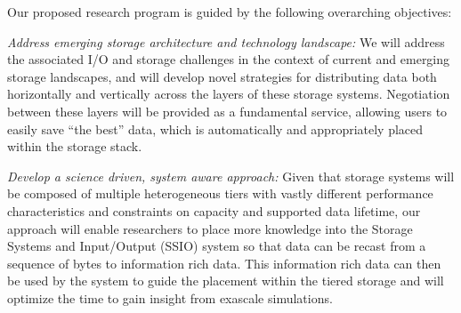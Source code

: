 % 
Our proposed research program is guided by the following overarching objectives:
\begin{tightItemize}
\item
{\em Address emerging storage architecture and technology landscape:}
We will address the associated I/O and storage challenges in the context of
current and emerging storage landscapes,
and will develop novel strategies for distributing 
data both horizontally and vertically across the layers of these storage systems.  
Negotiation between these layers will be provided as a fundamental service, allowing users to
easily save ``the best''  data, which is automatically and appropriately placed within the
 storage stack.
\item
{\em Develop a science driven, system aware approach:}
%
Given that storage systems will be composed of multiple heterogeneous tiers with
vastly different performance characteristics and constraints on capacity and 
supported data lifetime, our approach will enable researchers to 
place more knowledge into the Storage Systems and Input/Output (SSIO) system 
so that data can be recast from a sequence of bytes to information rich data. This 
information rich data can then be used by the system to guide the  placement within 
the tiered storage and will optimize the time to gain insight from 
exascale simulations.



\end{tightItemize}
